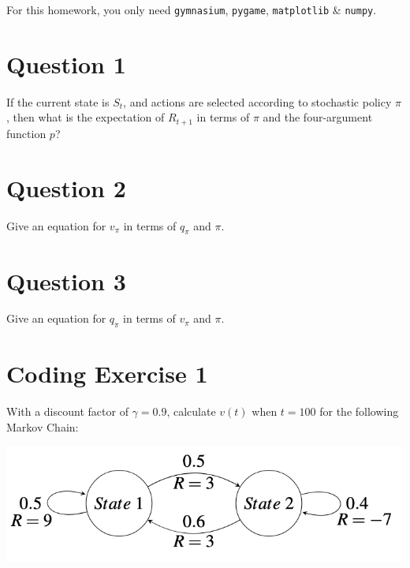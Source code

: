 \documentclass[
  letterpaper,
  DIV=11,
  numbers=noendperiod]{scrreprt}
\begin{document}
\begin{tcolorbox}[enhanced jigsaw, opacityback=0, left=2mm, breakable, bottomtitle=1mm, rightrule=.15mm, colframe=quarto-callout-note-color-frame, titlerule=0mm, colback=white, opacitybacktitle=0.6, toptitle=1mm, title=\textcolor{quarto-callout-note-color}{\faInfo}\hspace{0.5em}{Note}, colbacktitle=quarto-callout-note-color!10!white, bottomrule=.15mm, arc=.35mm, coltitle=black, leftrule=.75mm, toprule=.15mm]

For this homework, you only need \texttt{gymnasium}, \texttt{pygame},
\texttt{matplotlib} \& \texttt{numpy}.

\end{tcolorbox}

\section{Question 1}\label{question-1-1}

If the current state is \(S_{t}\), and actions are selected according to
stochastic policy \(\pi\), then what is the expectation of \(R_{t+1}\)
in terms of \(\pi\) and the four-argument function \(p\)?

\section{Question 2}\label{question-2-1}

Give an equation for \(v_{\pi}\) in terms of \(q_{\pi}\) and \(\pi\).

\section{Question 3}\label{question-3-1}

Give an equation for \(q_{\pi}\) in terms of \(v_{\pi}\) and \(\pi\).

\section{Coding Exercise 1}\label{coding-exercise-1-1}

With a discount factor of \(\gamma = 0.9\), calculate \(v(t)\) when
\(t = 100\) for the following Markov Chain:

\begin{center}
\includegraphics[width=0.4\linewidth,height=\textheight,keepaspectratio]{homework/images/hw4-1.png}
\end{center}
\end{document}
